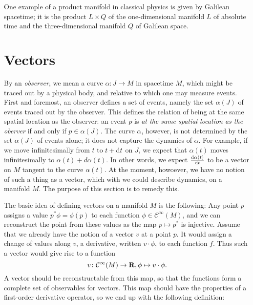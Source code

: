 One example of a product manifold in classical physics is given by Galilean
spacetime; it is the product $L \times Q$ of the one-dimensional manifold
$L$ of absolute time and the three-dimensional manifold $Q$ of Galilean space.

\section{Vectors}
\label{sec:vectors}

By an \emph{observer}, we mean a curve $\alpha\colon J \to M$ in spacetime $M$,
which might be traced out by a physical body, and relative to which one may
measure events. First and foremost, an observer defines a set of events, namely
the set $\alpha(J)$ of events traced out by the observer. This defines the
relation of being at the same spatial location as the observer: an event $p$ is 
\emph{at the same spatial location as the oberver} if and only if
$p \in \alpha(J)$. The curve $\alpha$, however, is not determined by the set
$\alpha(J)$ of events alone; it does not capture the dynamics of $\alpha$.
For example, if we move infinitesimally from $t$ to $t + \mathrm d t$ on $J$, we
expect that $\alpha(t)$ moves infinitesimally to $\alpha(t) + d \alpha(t)$. In
other words, we expect $\frac{\mathrm d\alpha(t)}{\mathrm d t}$ to be a vector on $M$
tangent to the curve $\alpha(t)$. At the moment, howoever, we have no notion of
such a thing as a vector, which with we could describe dynamics, on a manifold $M$.
The purpose of this section is to remedy this.

The basic idea of defining vectors on a manifold $M$ is the following:
Any point $p$ assigns a value $p^* \phi = \phi(p)$ to each function
$\phi \in \mathcal C^\infty(M)$, and we can reconstruct the point from these
values as the map $p \mapsto p^*$
is injective. Assume that we already have the notion of a vector $v$ at a point $p$.
It would assign a change of values along $v$, a derivative, written $v \cdot \phi$, to each
function $f$. Thus such a vector would give rise to a function
\[
  v\colon \mathcal C^\infty(M) \to \mathbf{R}, \phi \mapsto v \cdot \phi.
\]
A vector should be reconstructable from this map, so that the functions form
a complete set of observables for vectors. This map should have the
properties of a first-order derivative operator, so we end up with the following
definition:


